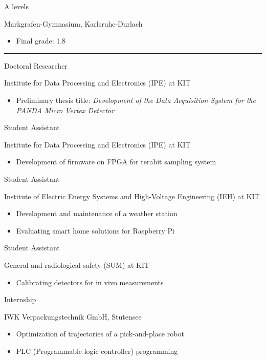 \documentclass[a4paper,10pt]{article}
\newlength{\cvcolumngapwidth}
\newlength{\cvleftcolumnwidth}
\newlength{\cvrightcolumnwidth}
\newcommand{\cvsectionstyle}[1]{{\normalsize\textcolor{cvsectioncolor}{#1}}}
\newcommand{\cvtitlestyle}[1]{{\large\textcolor{cvtitlecolor}{#1}}}
\newcommand{\cvdurationstyle}[1]{{\small\textcolor{cvdurationcolor}{#1}}}
\newlength{\cvafteritemskipamount}
\newlength{\cvaftersectionskipamount}
\newlength{\cvaftertitleskipamount}
\newlength{\cvparskip}
\newcommand{\cvsection}[1]{
    \begin{minipage}[t][][b]{\cvleftcolumnwidth}
        \raggedleft\cvsectionstyle{#1}
    \end{minipage}%
    \hspace{\cvcolumngapwidth}%
    \begin{minipage}[t]{\cvrightcolumnwidth}
        \textcolor{cvrulecolor}{\rule{\cvrightcolumnwidth}{0.3mm}}
    \end{minipage}

    \vspace{\cvaftersectionskipamount}
}
\newcommand{\cvitem}[2]{
    \begin{minipage}[t]{\cvleftcolumnwidth}
    \strut\vspace*{-\baselineskip}\newline %
    \raggedleft #1
    \end{minipage}%
    \hspace{\cvcolumngapwidth}%
    \begin{minipage}[t]{\cvrightcolumnwidth}
        \setlength{\parskip}{\cvparskip}
        \strut\vspace*{-\baselineskip}\newline #2 %
    \end{minipage}

    \vspace{\cvafteritemskipamount}
}
\newcommand{\cvtitle}[1]{
    \cvtitlestyle{#1}

    \vspace{\cvaftertitleskipamount}
    \vspace{-\cvparskip}
}
\begin{document}
\cvitem{\cvdurationstyle{2007 -- 2015}}{\cvtitle{A levels}
    Markgrafen-Gymnasium, Karlsruhe-Durlach
    \begin{itemize}[leftmargin=*]
        \item Final grade: 1.8
    \end{itemize}
}

\cvsection{WORK EXPERIENCE}

\cvitem{\cvdurationstyle{April 2022 -- present}}{\cvtitle{Doctoral Researcher}
	Institute for Data Processing and Electronics (IPE) at KIT
	\begin{itemize}[leftmargin=*]
		\item Preliminary thesis title: \textit{Development of the Data Acquisition System for the PANDA Micro Vertex Detector}
	\end{itemize}
}


\cvitem{\cvdurationstyle{September 2021 -- March 2022}}{\cvtitle{Student Assistant}
	Institute for Data Processing and Electronics (IPE) at KIT
	\begin{itemize}[leftmargin=*]
		\item Development of firmware on FPGA for terabit sampling system
	\end{itemize}
}

\cvitem{\cvdurationstyle{May 2017 -- June 2021}}{\cvtitle{Student Assistant}
    Institute of Electric Energy Systems and High-Voltage Engineering (IEH) at KIT
    \begin{itemize}[leftmargin=*]
        \item Development and maintenance of a weather station
        \item Evaluating smart home solutions for Raspberry Pi
    \end{itemize}
}

\cvitem{\cvdurationstyle{October 2018 -- December 2019}}{\cvtitle{Student Assistant}
	General and radiological safety (SUM) at KIT
	\begin{itemize}[leftmargin=*]
		\item Calibrating detectors for in vivo measurements
	\end{itemize}
}

\cvitem{\cvdurationstyle{April 2018 -- July 2018}}{\cvtitle{Internship}
    IWK Verpackungstechnik GmbH, Stutensee
    \begin{itemize}[leftmargin=*]
        \item Optimization of trajectories of a pick-and-place robot
        \item PLC (Programmable logic controller) programming
    \end{itemize}
}
\end{document}

